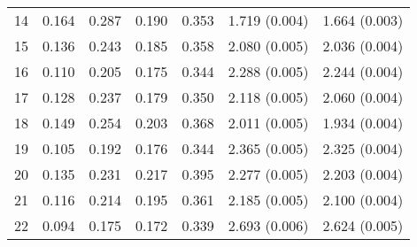 \begin{table}[!htbp]
\begin{tabularx}{\textwidth}{c *{4}{Y} cc}
14 & 0.164 & 0.287 & 0.190 & 0.353 & 1.719 (0.004) & 1.664 (0.003) \\
15 & 0.136 & 0.243 & 0.185 & 0.358 & 2.080 (0.005) & 2.036 (0.004) \\
16 & 0.110 & 0.205 & 0.175 & 0.344 & 2.288 (0.005) & 2.244 (0.004) \\
17 & 0.128 & 0.237 & 0.179 & 0.350 & 2.118 (0.005) & 2.060 (0.004) \\
18 & 0.149 & 0.254 & 0.203 & 0.368 & 2.011 (0.005) & 1.934 (0.004) \\
19 & 0.105 & 0.192 & 0.176 & 0.344 & 2.365 (0.005) & 2.325 (0.004) \\
20 & 0.135 & 0.231 & 0.217 & 0.395 & 2.277 (0.005) & 2.203 (0.004) \\
21 & 0.116 & 0.214 & 0.195 & 0.361 & 2.185 (0.005) & 2.100 (0.004) \\
22 & 0.094 & 0.175 & 0.172 & 0.339 & 2.693 (0.006) & 2.624 (0.005) \\
\bottomrule
\end{tabularx}
\end{table}

